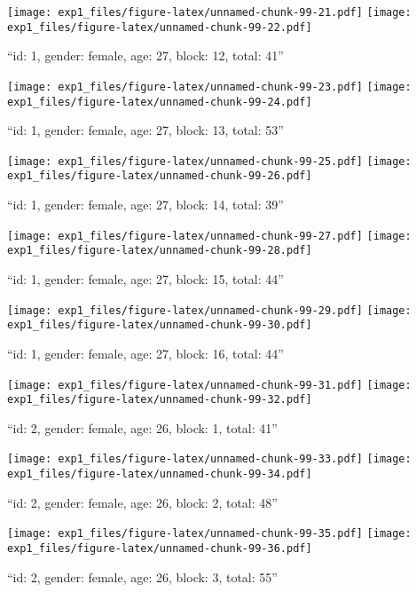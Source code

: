 \documentclass[,]{article}
\begin{document}
\texttt{[image: exp1\_files/figure-latex/unnamed-chunk-99-21.pdf]}
\texttt{[image: exp1\_files/figure-latex/unnamed-chunk-99-22.pdf]}

\newpage
[1] 

``id: 1, gender: female, age: 27, block: 12, total: 41''

\texttt{[image: exp1\_files/figure-latex/unnamed-chunk-99-23.pdf]}
\texttt{[image: exp1\_files/figure-latex/unnamed-chunk-99-24.pdf]}

\newpage
[1] 

``id: 1, gender: female, age: 27, block: 13, total: 53''

\texttt{[image: exp1\_files/figure-latex/unnamed-chunk-99-25.pdf]}
\texttt{[image: exp1\_files/figure-latex/unnamed-chunk-99-26.pdf]}

\newpage
[1] 

``id: 1, gender: female, age: 27, block: 14, total: 39''

\texttt{[image: exp1\_files/figure-latex/unnamed-chunk-99-27.pdf]}
\texttt{[image: exp1\_files/figure-latex/unnamed-chunk-99-28.pdf]}

\newpage
[1] 

``id: 1, gender: female, age: 27, block: 15, total: 44''

\texttt{[image: exp1\_files/figure-latex/unnamed-chunk-99-29.pdf]}
\texttt{[image: exp1\_files/figure-latex/unnamed-chunk-99-30.pdf]}

\newpage
[1] 

``id: 1, gender: female, age: 27, block: 16, total: 44''

\texttt{[image: exp1\_files/figure-latex/unnamed-chunk-99-31.pdf]}
\texttt{[image: exp1\_files/figure-latex/unnamed-chunk-99-32.pdf]}

\newpage
[1] 

``id: 2, gender: female, age: 26, block: 1, total: 41''

\texttt{[image: exp1\_files/figure-latex/unnamed-chunk-99-33.pdf]}
\texttt{[image: exp1\_files/figure-latex/unnamed-chunk-99-34.pdf]}

\newpage
[1] 

``id: 2, gender: female, age: 26, block: 2, total: 48''

\texttt{[image: exp1\_files/figure-latex/unnamed-chunk-99-35.pdf]}
\texttt{[image: exp1\_files/figure-latex/unnamed-chunk-99-36.pdf]}

\newpage
[1] 

``id: 2, gender: female, age: 26, block: 3, total: 55''
\end{document}
